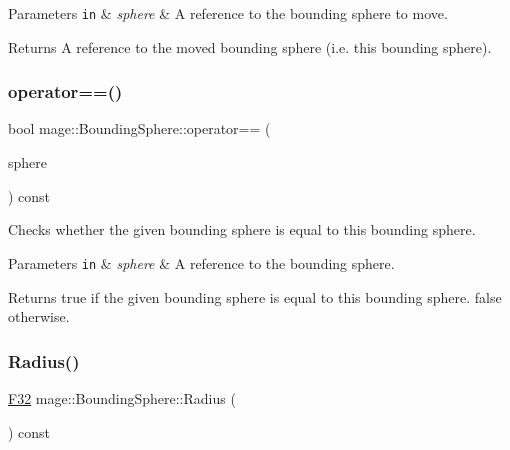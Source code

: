 \begin{DoxyParams}[1]{Parameters}
\mbox{\tt in}  & {\em sphere} & A reference to the bounding sphere to move. \\
\hline
\end{DoxyParams}
\begin{DoxyReturn}{Returns}
A reference to the moved bounding sphere (i.\+e. this bounding sphere). 
\end{DoxyReturn}
\hypertarget{classmage_1_1_bounding_sphere_adc183c59a09a071fbc78b833cc66f218}{}\label{classmage_1_1_bounding_sphere_adc183c59a09a071fbc78b833cc66f218} 
\subsubsection{\texorpdfstring{operator==()}{operator==()}}
{\footnotesize\ttfamily bool mage\+::\+Bounding\+Sphere\+::operator== (\begin{DoxyParamCaption}\item[{const \hyperlink{classmage_1_1_bounding_sphere}{Bounding\+Sphere} \&}]{sphere }\end{DoxyParamCaption}) const\hspace{0.3cm}{\ttfamily [noexcept]}}

Checks whether the given bounding sphere is equal to this bounding sphere.


\begin{DoxyParams}[1]{Parameters}
\mbox{\tt in}  & {\em sphere} & A reference to the bounding sphere. \\
\hline
\end{DoxyParams}
\begin{DoxyReturn}{Returns}
{\ttfamily true} if the given bounding sphere is equal to this bounding sphere. {\ttfamily false} otherwise. 
\end{DoxyReturn}
\hypertarget{classmage_1_1_bounding_sphere_a51c7e6db89c68d192961bfaf2114fb2f}{}\label{classmage_1_1_bounding_sphere_a51c7e6db89c68d192961bfaf2114fb2f} 
\subsubsection{\texorpdfstring{Radius()}{Radius()}}
{\footnotesize\ttfamily \hyperlink{namespacemage_aa97e833b45f06d60a0a9c4fc22ae02c0}{F32} mage\+::\+Bounding\+Sphere\+::\+Radius (\begin{DoxyParamCaption}{ }\end{DoxyParamCaption}) const\hspace{0.3cm}{\ttfamily [noexcept]}}

